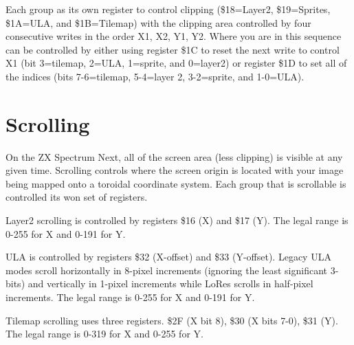 Each group as its own register to control clipping (\$18=Layer2,
\$19=Sprites, \$1A=ULA, and \$1B=Tilemap) with the clipping area
controlled by four consecutive writes in the order X1, X2, Y1,
Y2. Where you are in this sequence can be controlled by either using
register \$1C to reset the next write to control X1 (bit 3=tilemap,
2=ULA, 1=sprite, and 0=layer2) or register \$1D to set all of the
indices (bits 7-6=tilemap, 5-4=layer 2, 3-2=sprite, and 1-0=ULA).

\section{Scrolling}

On the ZX Spectrum Next, all of the screen area (less clipping) is
visible at any given time. Scrolling controls where the screen origin
is located with your image being mapped onto a toroidal coordinate
system. Each group that is scrollable is controlled its won set of
registers.

Layer2 scrolling is controlled by registers \$16 (X) and \$17 (Y). The
legal range is 0-255 for X and 0-191 for Y.

ULA is controlled by registers \$32 (X-offset) and \$33
(Y-offset). Legacy ULA modes scroll horizontally in 8-pixel increments
(ignoring the least significant 3-bits) and vertically in 1-pixel
increments while LoRes scrolls in half-pixel increments. The legal
range is 0-255 for X and 0-191 for Y.

Tilemap scrolling uses three registers. \$2F (X bit 8), \$30 (X bits
7-0), \$31 (Y). The legal range is 0-319 for X and 0-255 for Y.
